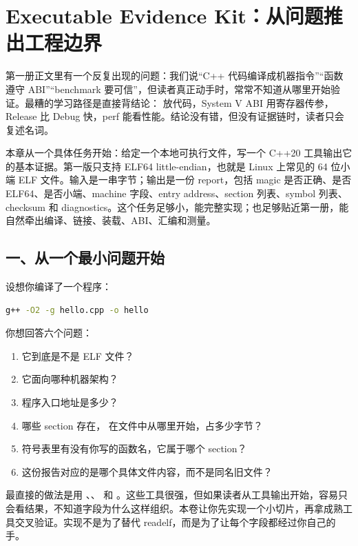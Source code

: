 \chapter{Executable Evidence Kit：从问题推出工程边界}

第一册正文里有一个反复出现的问题：我们说“C++ 代码编译成机器指令”“函数遵守 ABI”“benchmark 要可信”，但读者真正动手时，常常不知道从哪里开始验证。最糟的学习路径是直接背结论： 放代码，System V ABI 用寄存器传参，Release 比 Debug 快，perf 能看性能。结论没有错，但没有证据链时，读者只会复述名词。

本章从一个具体任务开始：给定一个本地可执行文件，写一个 C++20 工具输出它的基本证据。第一版只支持 ELF64 little-endian，也就是 Linux 上常见的 64 位小端 ELF 文件。输入是一串字节；输出是一份 report，包括 magic 是否正确、是否 ELF64、是否小端、machine 字段、entry address、section 列表、symbol 列表、checksum 和 diagnostics。这个任务足够小，能完整实现；也足够贴近第一册，能自然牵出编译、链接、装载、ABI、汇编和测量。

\section{一、从一个最小问题开始}

设想你编译了一个程序：

\begin{lstlisting}[language=bash]
g++ -O2 -g hello.cpp -o hello
\end{lstlisting}

你想回答六个问题：

\begin{enumerate}
  \item 它到底是不是 ELF 文件？
  \item 它面向哪种机器架构？
  \item 程序入口地址是多少？
  \item 哪些 section 存在， 在文件中从哪里开始，占多少字节？
  \item 符号表里有没有你写的函数名，它属于哪个 section？
  \item 这份报告对应的是哪个具体文件内容，而不是同名旧文件？
\end{enumerate}

最直接的做法是用 、、 和 。这些工具很强，但如果读者从工具输出开始，容易只会看结果，不知道字段为什么这样组织。本卷让你先实现一个小切片，再拿成熟工具交叉验证。实现不是为了替代 readelf，而是为了让每个字段都经过你自己的手。

